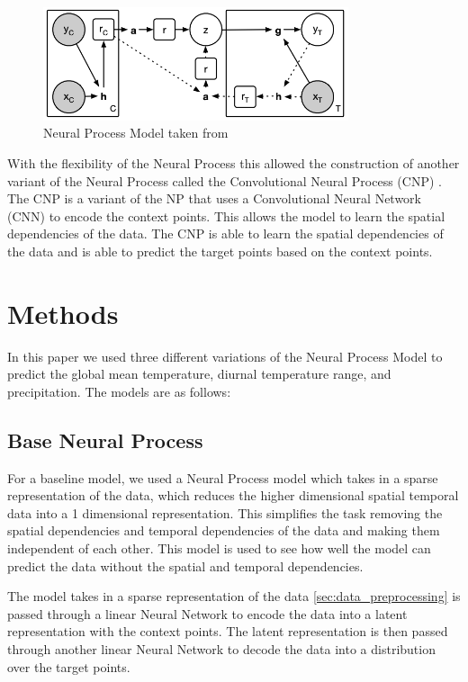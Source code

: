 \documentclass{article} %
\begin{document}
\begin{figure}[h!]
    \centering
    \includegraphics*[width=0.8\textwidth]{figure/np-model.png}
    \caption{Neural Process Model taken from \cite{garnelo2018neural}}
    \label{fig:np-model}
\end{figure}

With the flexibility of the Neural Process this allowed the construction of another variant of the Neural Process called the Convolutional Neural Process (CNP) \cite{gordon2020convolutional}. The CNP is a variant of the NP that uses a Convolutional Neural Network (CNN) to encode the context points. This allows the model to learn the spatial dependencies of the data. The CNP is able to learn the spatial dependencies of the data and is able to predict the target points based on the context points.

\section{Methods}
In this paper we used three different variations of the Neural Process Model to predict the global mean temperature, diurnal temperature range, and precipitation. The models are as follows:

\subsection*{Base Neural Process}
For a baseline model, we used a Neural Process model which takes in a sparse representation of the data, which reduces the higher dimensional spatial temporal data into a 1 dimensional representation. This simplifies the task removing the spatial dependencies and temporal dependencies of the data and making them independent of each other. This model is used to see how well the model can predict the data without the spatial and temporal dependencies.

The model takes in a sparse representation of the data \ref{sec:data_preprocessing} is passed through a linear Neural Network to encode the data into a latent representation with the context points. The latent representation is then passed through another linear Neural Network to decode the data into a distribution over the target points.
\end{document}
